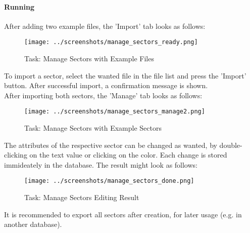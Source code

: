 \paragraph {Running}

After adding two example files, the 'Import' tab looks as follows:

\begin{figure}[H]
    \texttt{[image: ../screenshots/manage\_sectors\_ready.png]}
  \caption{Task: Manage Sectors with Example Files}
\end{figure}

To import a sector, select the wanted file in the file list and press the 'Import' button. After successful import, a confirmation message is shown. \\

After importing both sectors, the 'Manage' tab looks as follows:

\begin{figure}[H]
    \texttt{[image: ../screenshots/manage\_sectors\_manage2.png]}
  \caption{Task: Manage Sectors with Example Sectors}
\end{figure}

The attributes of the respective sector can be changed as wanted, by double-clicking on the text value or clicking on the color. Each change is stored immideately in the database. The result might look as follows:\\

\begin{figure}[H]
    \texttt{[image: ../screenshots/manage\_sectors\_done.png]}
  \caption{Task: Manage Sectors Editing Result}
\end{figure}

It is recommended to export all sectors after creation, for later usage (e.g. in another database).

